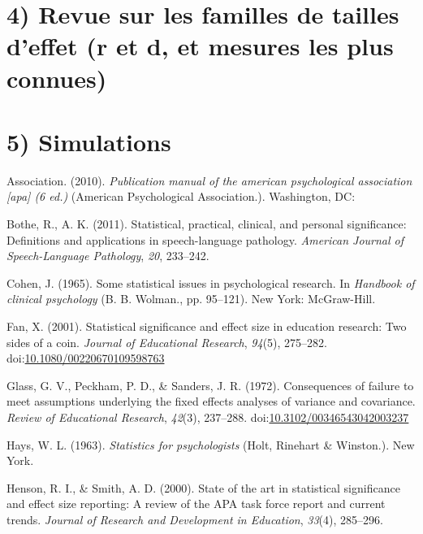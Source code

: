 \documentclass[man]{apa6}
\begin{document}
\hypertarget{revue-sur-les-familles-de-tailles-deffet-r-et-d-et-mesures-les-plus-connues}{%
\section{4) Revue sur les familles de tailles d'effet (r et d, et mesures les plus connues)}\label{revue-sur-les-familles-de-tailles-deffet-r-et-d-et-mesures-les-plus-connues}}

\hypertarget{simulations}{%
\section*{5) Simulations}\label{simulations}}

\hypertarget{refs}{}
\leavevmode\hypertarget{ref-APA_2010}{}%
Association. (2010). \emph{Publication manual of the american psychological association {[}apa{]} (6 ed.)} (American Psychological Association.). Washington, DC:

\leavevmode\hypertarget{ref-Bothe_Richardson_2011}{}%
Bothe, R., A. K. (2011). Statistical, practical, clinical, and personal significance: Definitions and applications in speech-language pathology. \emph{American Journal of Speech-Language Pathology}, \emph{20}, 233--242.

\leavevmode\hypertarget{ref-Cohen_1965}{}%
Cohen, J. (1965). Some statistical issues in psychological research. In \emph{Handbook of clinical psychology} (B. B. Wolman., pp. 95--121). New York: McGraw-Hill.

\leavevmode\hypertarget{ref-Fan_2001}{}%
Fan, X. (2001). Statistical significance and effect size in education research: Two sides of a coin. \emph{Journal of Educational Research}, \emph{94}(5), 275--282. doi:\href{https://doi.org/10.1080/00220670109598763}{10.1080/00220670109598763}

\leavevmode\hypertarget{ref-Glass_et_al_1972}{}%
Glass, G. V., Peckham, P. D., \& Sanders, J. R. (1972). Consequences of failure to meet assumptions underlying the fixed effects analyses of variance and covariance. \emph{Review of Educational Research}, \emph{42}(3), 237--288. doi:\href{https://doi.org/10.3102/00346543042003237}{10.3102/00346543042003237}

\leavevmode\hypertarget{ref-Hays_1963}{}%
Hays, W. L. (1963). \emph{Statistics for psychologists} (Holt, Rinehart \& Winston.). New York.

\leavevmode\hypertarget{ref-Henson_Smith_2000}{}%
Henson, R. I., \& Smith, A. D. (2000). State of the art in statistical significance and effect size reporting: A review of the APA task force report and current trends. \emph{Journal of Research and Development in Education}, \emph{33}(4), 285--296.
\end{document}
